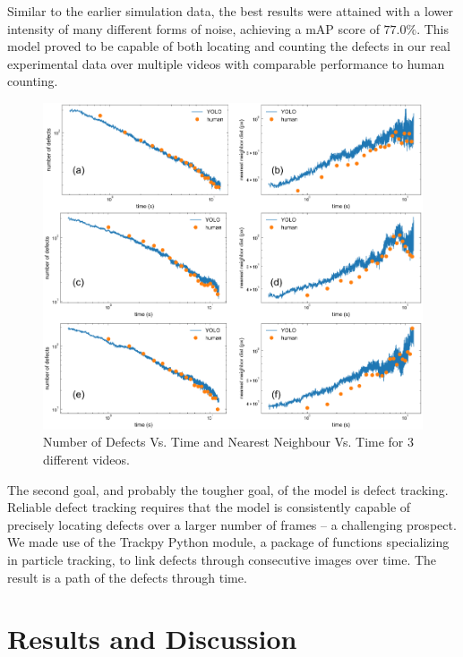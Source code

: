 \documentclass[prl,reprint,showpacs,floatfix,nofootinbib]{revtex4-1}
\begin{document}
Similar to the earlier simulation data, the best results were attained with a lower intensity of many different forms of noise, achieving a mAP score of $77.0\%$. This model proved to be capable of both locating and counting the defects in our real experimental data over multiple videos with comparable performance to human counting. 

\begin{figure}
  \includegraphics[width=\linewidth]{humanVmachineAllR.png}
  \caption{Number of Defects Vs. Time and Nearest Neighbour Vs. Time for 3 different videos.}
  \label{fig:HumanVMachine}
\end{figure}

The second goal, and probably the tougher goal, of the model is defect tracking. Reliable defect tracking requires that the model is consistently capable of precisely locating defects over a larger number of frames -- a challenging prospect. We made use of the Trackpy Python module, a package of functions specializing in particle tracking, to link defects through consecutive images over time. The result is a path of the defects through time.  

\section{Results and Discussion}
\blindtext{}

%
%
\end{document}
